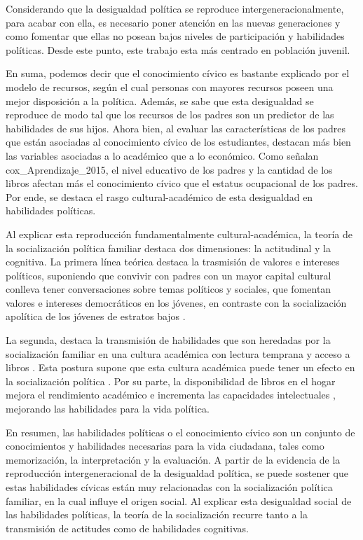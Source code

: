 \documentclass[12pt,twoside]{templates/facsothesis}
\begin{document}
Considerando que la desigualdad política se reproduce intergeneracionalmente, para acabar con ella, es necesario poner atención en las nuevas generaciones y como fomentar que ellas no posean bajos niveles de participación y habilidades políticas. Desde este punto, este trabajo esta más centrado en población juvenil.

En suma, podemos decir que el conocimiento cívico es bastante explicado por el modelo de recursos, según el cual personas con mayores recursos poseen una mejor disposición a la política. Además, se sabe que esta desigualdad se reproduce de modo tal que los recursos de los padres son un predictor de las habilidades de sus hijos. Ahora bien, al evaluar las características de los padres que están asociadas al conocimiento cívico de los estudiantes, destacan más bien las variables asociadas a lo académico que a lo económico. Como señalan cox\_Aprendizaje\_2015, el nivel educativo de los padres y la cantidad de los libros afectan más el conocimiento cívico que el estatus ocupacional de los padres. Por ende, se destaca el rasgo cultural-académico de esta desigualdad en habilidades políticas.

Al explicar esta reproducción fundamentalmente cultural-académica, la teoría de la socialización política familiar destaca dos dimensiones: la actitudinal y la cognitiva. La primera línea teórica destaca la trasmisión de valores e intereses políticos, suponiendo que convivir con padres con un mayor capital cultural conlleva tener conversaciones sobre temas políticos y sociales, que fomentan valores e intereses democráticos en los jóvenes, en contraste con la socialización apolítica de los jóvenes de estratos bajos \citep{gimpel_Cultivating_2003, wasburn_Making_2017}.

La segunda, destaca la transmisión de habilidades que son heredadas por la socialización familiar en una cultura académica con lectura temprana y acceso a libros \citep{evans_Scholarly_2015, park_Home_2008}. Esta postura supone que esta cultura académica puede tener un efecto en la socialización política \citep{duarte_influence_2017, boeve-depauw_crossnational_2010}. Por su parte, la disponibilidad de libros en el hogar mejora el rendimiento académico e incrementa las capacidades intelectuales \citep{evans_Scholarly_2015}, mejorando las habilidades para la vida política.

En resumen, las habilidades políticas o el conocimiento cívico son un conjunto de conocimientos y habilidades necesarias para la vida ciudadana, tales como memorización, la interpretación y la evaluación. A partir de la evidencia de la reproducción intergeneracional de la desigualdad política, se puede sostener que estas habilidades cívicas están muy relacionadas con la socialización política familiar, en la cual influye el origen social. Al explicar esta desigualdad social de las habilidades políticas, la teoría de la socialización recurre tanto a la transmisión de actitudes como de habilidades cognitivas.
\end{document}
